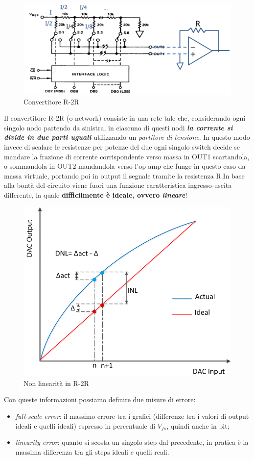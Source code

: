 \documentclass[
]{book}
\providecommand{\tightlist}{%
  \setlength{\itemsep}{0pt}\setlength{\parskip}{0pt}}
\begin{document}
\begin{figure}
\centering
\includegraphics[width=0.6\linewidth,height=\textheight,keepaspectratio]{immagini/42.png}
\caption{Convertitore R-2R}
\end{figure}

Il convertitore R-2R (o network) consiste in una rete tale che,
considerando ogni singolo nodo partendo da sinistra, in ciascuno di
questi nodi \textbf{\emph{la corrente si divide in due parti uguali}}
utilizzando un \emph{partitore di tensione}. In questo modo invece di
scalare le resistenze per potenze del due ogni singolo switch decide se
mandare la frazione di corrente corrispondente verso massa in OUT1
scartandola, o sommandola in OUT2 mandandola verso l'op-amp che funge in
questo caso da massa virtuale, portando poi in output il segnale tramite
la resistenza R.\newline In base alla bontà del circuito viene fuori una
funzione caratteristica ingresso-uscita differente, la quale
\textbf{difficilmente è ideale, ovvero \emph{lineare}}!

\begin{figure}
\centering
\includegraphics[width=0.5\linewidth,height=\textheight,keepaspectratio]{assets/imgs/Non-linearity-in-DAC.png}
\caption{Non linearità in R-2R}
\end{figure}

Con queste informazioni possiamo definire due misure di errore:

\begin{itemize}
\tightlist
\item
  \emph{full-scale error}: il massimo errore tra i grafici (differenze
  tra i valori di output ideali e quelli ideali) espresso in percentuale
  di \(V_{fs}\), quindi anche in bit;
\item
  \emph{linearity error}: quanto si scosta un singolo step dal
  precedente, in pratica è la massima differenza tra gli steps ideali e
  quelli reali.
\end{itemize}
\end{document}
